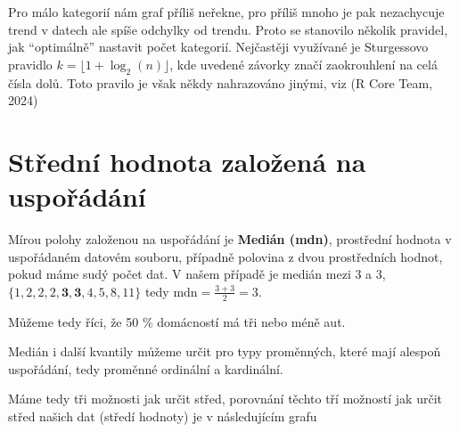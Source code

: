 \documentclass[
  czech,
  11pt,
  letterpaper,
  DIV=11,
  numbers=noendperiod]{scrreprt}
\begin{document}
Pro málo kategorií nám graf příliš neřekne, pro příliš mnoho je pak
nezachycuje trend v datech ale spíše odchylky od trendu. Proto se
stanovilo několik pravidel, jak ``optimálně'' nastavit počet kategorií.
Nejčastěji využívané je Sturgessovo pravidlo
\(k=\lfloor 1+\log_2(n)\rfloor\), kde uvedené závorky značí zaokrouhlení
na celá čísla dolů. Toto pravilo je však někdy nahrazováno jinými, viz
(R Core Team, 2024)

\section{Střední hodnota založená na
uspořádání}\label{stux159ednuxed-hodnota-zaloux17eenuxe1-na-uspoux159uxe1duxe1nuxed}

Mírou polohy založenou na uspořádání je \textbf{Medián (mdn)},
prostřední hodnota v uspořádaném datovém souboru, případně polovina z
dvou prostředních hodnot, pokud máme sudý počet dat. V našem případě je
medián mezi 3 a 3, \(\{1, 2, 2, 2, \mathbf{ 3, 3}, 4, 5, 8, 11\}\) tedy
\(\text{mdn} = \frac{3 + 3}{2} = 3\).

Můžeme tedy říci, že 50 \% domácností má tři nebo méně aut.

\begin{tcolorbox}[enhanced jigsaw, arc=.35mm, bottomrule=.15mm, bottomtitle=1mm, breakable, colback=white, colbacktitle=quarto-callout-note-color!10!white, colframe=quarto-callout-note-color-frame, coltitle=black, left=2mm, leftrule=.75mm, opacityback=0, opacitybacktitle=0.6, rightrule=.15mm, title=\textcolor{quarto-callout-note-color}{\faInfo}\hspace{0.5em}{Poznámka}, titlerule=0mm, toprule=.15mm, toptitle=1mm]

Medián i další kvantily můžeme určit pro typy proměnných, které mají
alespoň uspořádání, tedy proměnné ordinální a kardinální.

\end{tcolorbox}

Máme tedy tři možnosti jak určit střed, porovnání těchto tří možností
jak určit střed našich dat (středí hodnoty) je v následujícím grafu
\end{document}
